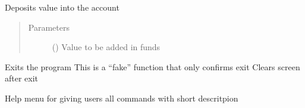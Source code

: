 \documentclass[letterpaper,10pt,english]{sphinxmanual}
\begin{document}

\begin{fulllineitems}
\label{\detokenize{sample:sample.terminalFunctions.clear}}
\end{fulllineitems}


\begin{fulllineitems}
\label{\detokenize{sample:sample.terminalFunctions.deposit}}
Deposits value into the account
\begin{quote}\begin{description}
\item[{Parameters}] \leavevmode
{} () \textendash{} Value to be added in funds

\end{description}\end{quote}

\end{fulllineitems}


\begin{fulllineitems}
\label{\detokenize{sample:sample.terminalFunctions.exit}}
Exits the program
This is a “fake” function that only confirms exit
Clears screen after exit

\end{fulllineitems}


\begin{fulllineitems}
\label{\detokenize{sample:sample.terminalFunctions.help}}
Help menu for giving users all commands with short descritpion

\end{fulllineitems}
\end{document}
